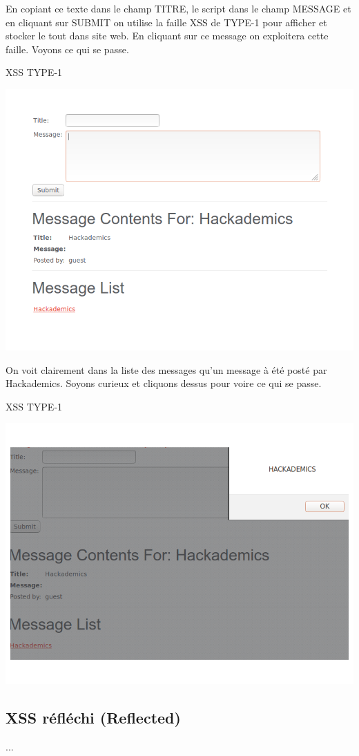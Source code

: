 \begin{flushleft}
En copiant ce texte dans le champ TITRE, le script dans le champ MESSAGE et  en cliquant sur SUBMIT on utilise la faille XSS de TYPE-1 pour afficher et stocker le tout dans site web. En cliquant sur ce message on exploitera cette faille. Voyons ce qui se passe.
\end{flushleft}


\begin{center}
\caption{XSS TYPE-1}
\includegraphics[scale=0.3]{Web/assets/xsst1-1.png}
\end{center}

\bigskip

\begin{flushleft}
On voit clairement dans la liste des messages qu'un message à été posté par Hackademics. Soyons curieux et cliquons dessus pour voire ce qui se passe.
\end{flushleft}

\bigskip

\begin{center}
\caption{XSS TYPE-1}
\includegraphics[scale=0.3]{Web/assets/xsst1-2.png}
\end{center}


\subsection{XSS réfléchi (Reflected)}\label{vulnerabilites:web:xss:reflected}

...

\endinput
